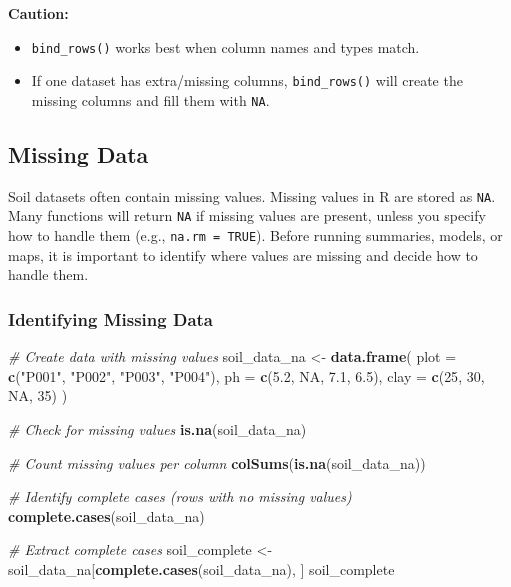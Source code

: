\documentclass[
  10pt,
  b5paper,
  oneside]{book}
\newenvironment{Shaded}{\begin{snugshade}}{\end{snugshade}}
\newcommand{\AttributeTok}[1]{\textcolor[rgb]{0.13,0.29,0.53}{#1}}
\newcommand{\CommentTok}[1]{\textcolor[rgb]{0.56,0.35,0.01}{\textit{#1}}}
\newcommand{\ConstantTok}[1]{\textcolor[rgb]{0.56,0.35,0.01}{#1}}
\newcommand{\DecValTok}[1]{\textcolor[rgb]{0.00,0.00,0.81}{#1}}
\newcommand{\FloatTok}[1]{\textcolor[rgb]{0.00,0.00,0.81}{#1}}
\newcommand{\FunctionTok}[1]{\textcolor[rgb]{0.13,0.29,0.53}{\textbf{#1}}}
\newcommand{\NormalTok}[1]{#1}
\newcommand{\OtherTok}[1]{\textcolor[rgb]{0.56,0.35,0.01}{#1}}
\newcommand{\StringTok}[1]{\textcolor[rgb]{0.31,0.60,0.02}{#1}}
\begin{document}
\textbf{Caution:}

\begin{itemize}
\item
  \texttt{bind\_rows()} works best when column names and types match.
\item
  If one dataset has extra/missing columns, \texttt{bind\_rows()} will create the missing columns and fill them with \texttt{NA}.
\end{itemize}

\subsection{Missing Data}\label{NA}

Soil datasets often contain missing values.
Missing values in R are stored as \texttt{NA}. Many functions will return \texttt{NA} if missing values are present, unless you specify how to handle them (e.g., \texttt{na.rm\ =\ TRUE}).
Before running summaries, models, or maps, it is important to identify where values are missing and decide how to handle them.

\subsubsection{Identifying Missing Data}\label{identify-NA}

\begin{Shaded}
\begin{Highlighting}[]
\CommentTok{\# Create data with missing values}
\NormalTok{soil\_data\_na }\OtherTok{\textless{}{-}} \FunctionTok{data.frame}\NormalTok{(}
  \AttributeTok{plot =} \FunctionTok{c}\NormalTok{(}\StringTok{"P001"}\NormalTok{, }\StringTok{"P002"}\NormalTok{, }\StringTok{"P003"}\NormalTok{, }\StringTok{"P004"}\NormalTok{),}
  \AttributeTok{ph =} \FunctionTok{c}\NormalTok{(}\FloatTok{5.2}\NormalTok{, }\ConstantTok{NA}\NormalTok{, }\FloatTok{7.1}\NormalTok{, }\FloatTok{6.5}\NormalTok{),}
  \AttributeTok{clay =} \FunctionTok{c}\NormalTok{(}\DecValTok{25}\NormalTok{, }\DecValTok{30}\NormalTok{, }\ConstantTok{NA}\NormalTok{, }\DecValTok{35}\NormalTok{)}
\NormalTok{)}

\CommentTok{\# Check for missing values}
\FunctionTok{is.na}\NormalTok{(soil\_data\_na)}

\CommentTok{\# Count missing values per column}
\FunctionTok{colSums}\NormalTok{(}\FunctionTok{is.na}\NormalTok{(soil\_data\_na))}

\CommentTok{\# Identify complete cases (rows with no missing values)}
\FunctionTok{complete.cases}\NormalTok{(soil\_data\_na)}

\CommentTok{\# Extract complete cases}
\NormalTok{soil\_complete }\OtherTok{\textless{}{-}}\NormalTok{ soil\_data\_na[}\FunctionTok{complete.cases}\NormalTok{(soil\_data\_na), ]}
\NormalTok{soil\_complete}
\end{Highlighting}
\end{Shaded}
\end{document}
